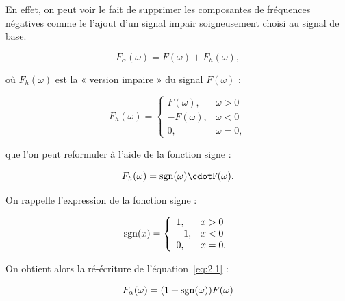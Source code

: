 En effet, on peut voir le fait de supprimer les composantes de fréquences négatives comme le l'ajout d'un signal impair soigneusement choisi au signal de base.

\begin{equation} \label{eq:2.1}
    F_{\alpha}(\omega) = F(\omega) + F_h(\omega),
\end{equation}

où $F_h(\omega)$ est la « version impaire » du signal $F(\omega)$ :

\begin{equation}
    F_h(\omega) = \left\{
    \begin{array}{ll}
        F(\omega), & \omega > 0 \\
        -F(\omega), & \omega < 0 \\
        0, & \omega = 0,
    \end{array}
    \right.
\end{equation}

que l'on peut reformuler à l'aide de la fonction signe :

\begin{equation}
    F_h(\omega) = \sgn(\omega)\cdotF(\omega).
    \label{eq:2.5}
\end{equation}

On rappelle l'expression de la fonction signe :

\begin{equation}
    \operatorname{sgn}(x) = \left\{
    \begin{array}{ll}
        1, & x > 0 \\
        -1, & x < 0 \\
        0, & x = 0.
    \end{array}
    \right.
\end{equation}

On obtient alors la ré-écriture de l'équation~\ref{eq:2.1} :

\begin{equation}
    F_{\alpha}(\omega) = (1+\operatorname{sgn}(\omega))F(\omega)
\end{equation}

